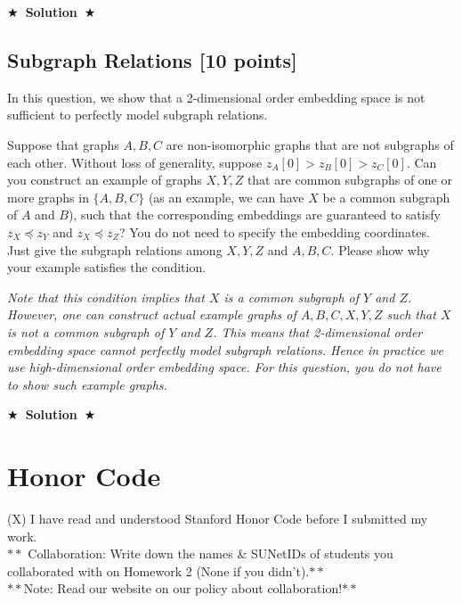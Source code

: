 \documentclass{article}
\newcommand{\Solution}[1]{{\medskip \color{black} \bf $\bigstar$~\sf \textbf{Solution}~$\bigstar$ \sf #1 } \bigskip}
\begin{document}
\Solution{}

\subsection{Subgraph Relations [10 points]}
In this question, we show that a 2-dimensional order embedding space is not sufficient to perfectly model subgraph relations.

Suppose that graphs $A, B, C$ are non-isomorphic graphs that are not subgraphs of each other. Without loss of generality, suppose $z_A[0] > z_B[0] > z_C[0]$. Can you construct an example of graphs $X,Y,Z$ that are common subgraphs of one or more graphs in $\{A,B,C\}$ (as an example, we can have $X$ be a common subgraph of $A$ and $B$), such that the corresponding embeddings are guaranteed to satisfy $z_X \preccurlyeq z_Y$ and $z_X \preccurlyeq z_Z$? You do not need to specify the embedding coordinates. Just give the subgraph relations among $X, Y, Z$ and $A, B, C$. Please show why your example satisfies the condition.

\textit{Note that this condition implies that $X$ is a common subgraph of $Y$ and $Z$. However, one can construct actual example graphs of $A, B, C, X, Y, Z$ such that $X$ is not a common subgraph of $Y$ and $Z$. This means that 2-dimensional order embedding space cannot perfectly model subgraph relations. Hence in practice we use high-dimensional order embedding space. For this question, you do not have to show such example graphs.}

\Solution{}




\section{Honor Code}
(X) I have read and understood Stanford Honor Code before I submitted my work.
\\ $**$ Collaboration: Write down the names \& SUNetIDs of students you collaborated with on Homework 2 (None if you didn’t).$**$
\\ $**$Note: Read our website on our policy about collaboration!$**$
\end{document}
